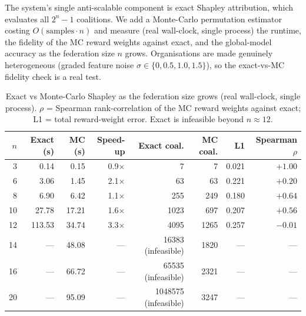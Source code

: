 The system's single anti-scalable component is exact Shapley attribution, which evaluates all $2^{n}-1$ coalitions. We add a Monte-Carlo permutation estimator costing $O(\text{samples}\cdot n)$ and measure (real wall-clock, single process) the runtime, the fidelity of the MC reward weights against exact, and the global-model accuracy as the federation size $n$ grows. Organisations are made genuinely heterogeneous (graded feature noise $\sigma\in\{0,0.5,1.0,1.5\}$), so the exact-vs-MC fidelity check is a real test.

\begin{table}[H]
\centering
\caption{Exact vs Monte-Carlo Shapley as the federation size grows (real wall-clock, single process). $\rho$ = Spearman rank-correlation of the MC reward weights against exact; L1 = total reward-weight error. Exact is infeasible beyond $n\approx 12$.}
\label{tab:scalability}
\small\setlength{\tabcolsep}{4pt}
\begin{tabular}{|r|r|r|r|r|r|r|r|}
\hline
$n$ & Exact (s) & MC (s) & Speed-up & Exact coal. & MC coal. & L1 & Spearman $\rho$ \\ \hline
3   & 0.14   & 0.15  & 0.9$\times$ & 7    & 7    & 0.021 & $+1.00$ \\ \hline
6   & 3.06   & 1.45  & 2.1$\times$ & 63   & 63   & 0.221 & $+0.20$ \\ \hline
8   & 6.90   & 6.42  & 1.1$\times$ & 255  & 249  & 0.180 & $+0.64$ \\ \hline
10  & 27.78  & 17.21 & 1.6$\times$ & 1023 & 697  & 0.207 & $+0.56$ \\ \hline
12  & 113.53 & 34.74 & 3.3$\times$ & 4095 & 1265 & 0.257 & $-0.01$ \\ \hline
14  & ---    & 48.08 & ---         & 16383 (infeasible) & 1820 & --- & --- \\ \hline
16  & ---    & 66.72 & ---         & 65535 (infeasible) & 2321 & --- & --- \\ \hline
20  & ---    & 95.09 & ---         & 1048575 (infeasible) & 3247 & --- & --- \\ \hline
\end{tabular}
\end{table}

